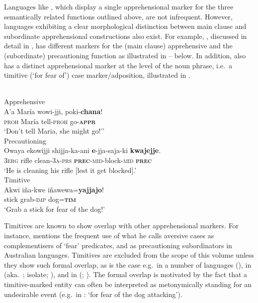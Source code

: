 \documentclass[output=paper,colorlinks,citecolor=brown]{langscibook}
\begin{document}
 Languages like , which display a single apprehensional marker for the three semantically related functions outlined above, are not infrequent. However, languages exhibiting a clear morphological distinction between main clause and subordinate apprehensional constructions also exist. For example, , discussed in detail in \citet{vuillermet2018a}, has different markers for the (main clause) apprehensive and the (subordinate) precautioning function as illustrated in -- below. In addition,  also has a distinct apprehensional marker at the level of the noun phrase, i.e.\ a timitive (`for fear of') case marker/adposition, illustrated in .


\ea 
\label{ex:intro5}
\\
\ea \label{ex:intro5a} \textnormal{Apprehensive} \\
\gll A'a María wowi-jji, poki-\textbf{chana}! \\
\textsc{proh} María tell-\textsc{proh} go-\textsc{\textbf{appr}} \\
\glt `Don't tell Maria, she might go!'' \\
\ex \label{ex:intro5b} \textnormal{Precautioning} \\
\gll Owaya ekowijji shijja-ka-ani {\ob}\textbf{e}-jja-saja-ki \textbf{kwajejje}{\cb}. \\
\textsc{3erg} rifle clean-3\textsc{a-prs} \textsc{\textbf{prec}-mid}-block-\textsc{mid} \textsc{\textbf{prec}} \\
\glt `He is cleaning his rifle [lest it get blocked].' \\
    \ex \label{ex:intro5c} \textnormal{Timitive} \\
\gll Akwi iña-kwe iñawewa=\textbf{yajjajo}! \\
stick grab-\textsc{imp} dog=\textsc{\textbf{tim}} \\
\glt `Grab a stick for fear of the dog!'
\z
\z

 Timitives are known to show overlap with other apprehensional markers. For instance, \citet[74, 88]{dixon2009} mentions the frequent use of what he calls aversive cases as complementisers of `fear' predicates, and as precautioning subordinators in Australian languages. Timitives are excluded from the scope of this volume unless they show such formal overlap, as is the case e.g.\ in a number of  languages (\citealt{chapters/browne}), in  (aka.\ ; isolate; \citealt{chapters/dabkowski-anderbois}), and in  (; \citealt{chapters/lovick}). The formal overlap is motivated by the fact that a timitive-marked entity can often be interpreted as metonymically standing for an undesirable event (e.g.\ in : `for fear of the dog attacking').
\end{document}
